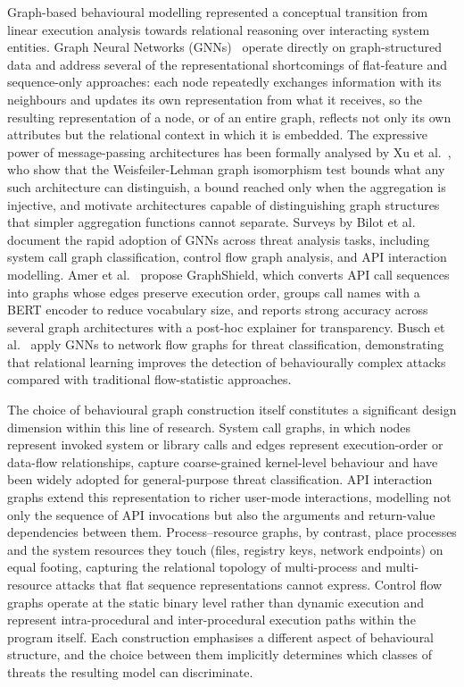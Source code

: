 \documentclass[%
    BCOR=10mm,
    DIV=13,
    toc=bibliography,
    toc=listof,
    oneside,
    12pt,
]{scrbook}
\begin{document}
Graph-based behavioural modelling represented a conceptual transition from
linear execution analysis towards relational reasoning over interacting system
entities. Graph Neural Networks (GNNs)~\cite{scarselli2009, gilmer2017mpnn,
kipf2017gcn} operate directly on graph-structured data and address several of
the representational shortcomings of flat-feature and sequence-only
approaches: each node repeatedly exchanges information with its neighbours
and updates its own representation from what it receives, so the resulting
representation of a node, or of an entire graph, reflects not only its own
attributes but the relational context in which it is embedded. The expressive
power of message-passing architectures has been formally analysed by Xu et
al.~\cite{xu2018powerful}, who show that the Weisfeiler-Lehman graph
isomorphism test bounds what any such architecture can distinguish, a bound
reached only when the aggregation is injective, and motivate architectures
capable of distinguishing graph structures that simpler aggregation functions
cannot separate. Surveys by Bilot et al.~\cite{bilot2024survey,
bilot2023intrusion} document the rapid adoption of GNNs across threat analysis
tasks, including system call graph
classification, control flow graph analysis, and API interaction modelling.
Amer et al.~\cite{amer2025graphshield} propose GraphShield, which converts API
call sequences into graphs whose edges preserve execution order, groups call
names with a BERT encoder to reduce vocabulary size, and reports strong accuracy
across several graph architectures with a post-hoc explainer for transparency.
Busch et al.~\cite{busch2022} apply GNNs to network flow graphs for threat
classification, demonstrating that relational learning improves the detection
of behaviourally complex attacks compared with traditional flow-statistic
approaches.

The choice of behavioural graph construction itself constitutes a significant
design dimension within this line of research. System call graphs, in which
nodes represent invoked system or library calls and edges represent
execution-order or data-flow relationships, capture coarse-grained kernel-level
behaviour and have been widely adopted for general-purpose threat
classification. API interaction graphs extend this representation to richer
user-mode interactions, modelling not only the sequence of API invocations but
also the arguments and return-value dependencies between them.
Process--resource graphs, by contrast, place processes and the system resources
they touch (files, registry keys, network endpoints) on equal footing,
capturing the relational topology of multi-process and multi-resource attacks
that flat sequence representations cannot express. Control flow graphs operate
at the static binary level rather than dynamic execution and represent
intra-procedural and inter-procedural execution paths within the program
itself. Each construction emphasises a different aspect of behavioural
structure, and the choice between them implicitly determines which classes of
threats the resulting model can discriminate.
\end{document}
